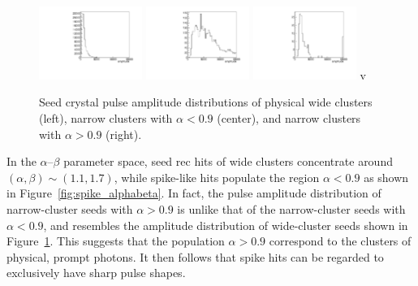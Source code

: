 \begin{figure}[tbp]
  \begin{center}
    \includegraphics[width=0.3\textwidth]{Reconstruction/Figures/spikes/physical_amplitude.pdf}
    \includegraphics[width=0.3\textwidth]{Reconstruction/Figures/spikes/spike_amplitude.pdf}
    \includegraphics[width=0.3\textwidth]{Reconstruction/Figures/spikes/narrow_largealpha_amplitude.pdf}
v    \caption{
      Seed crystal pulse amplitude distributions of physical wide clusters (left), narrow clusters with $\alpha < 0.9$ (center), and narrow clusters with $\alpha > 0.9$ (right).
    }
    \label{fig:spike_amplitudes}
  \end{center}
\end{figure}

In the $\alpha$--$\beta$ parameter space, seed rec hits of wide clusters concentrate around $(\alpha, \beta) \sim (1.1, 1.7)$, while spike-like hits populate the region $\alpha < 0.9$ as shown in Figure~\ref{fig:spike_alphabeta}.
In fact, the pulse amplitude distribution of narrow-cluster seeds with $\alpha > 0.9$ is unlike that of the narrow-cluster seeds with $\alpha < 0.9$, and resembles the amplitude distribution of wide-cluster seeds shown in Figure~\ref{fig:spike_amplitudes}.
This suggests that the population $\alpha > 0.9$ correspond to the clusters of physical, prompt photons.
It then follows that spike hits can be regarded to exclusively have sharp pulse shapes.
\fi
